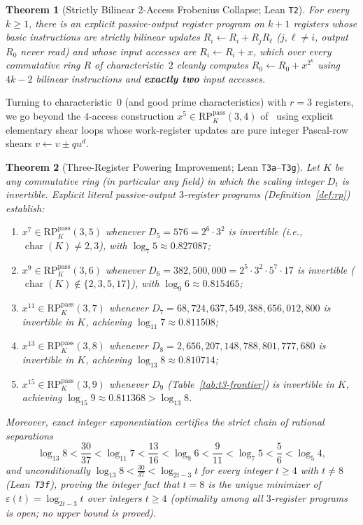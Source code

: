 \documentclass[11pt,reqno]{amsart}
\newtheorem{theorem}{Theorem}[section]
\theoremstyle{definition}
\newcommand{\RP}{\mathrm{RP}}
\newcommand{\pass}{\mathrm{pass}}
\begin{document}
\begin{theorem}[Strictly Bilinear 2-Access Frobenius Collapse; Lean \texttt{T2}]
\label{thm:T2}
For every $k \ge 1$, there is an explicit passive-output register program on $k + 1$ registers whose basic instructions are strictly bilinear updates $R_i \leftarrow R_i + R_j R_\ell$ ($j, \ell \neq i$, output $R_0$ never read) and whose input accesses are $R_i \leftarrow R_i + x$, which over \emph{every} commutative ring $R$ of characteristic~$2$ cleanly computes $R_0 \leftarrow R_0 + x^{2^k}$ using $4k - 2$ bilinear instructions and \textbf{exactly two} input accesses.
\end{theorem}

Turning to characteristic~$0$ (and good prime characteristics) with $r = 3$ registers, we go beyond the $4$-access construction $x^5 \in \RP_K^{\pass}(3, 4)$ of~\cite[Theorem~2.3]{Vinciguerra2026} using explicit elementary shear loops whose work-register updates are pure integer Pascal-row shears $v \leftarrow v \pm q u^d$.

\begin{theorem}[Three-Register Powering Improvement; Lean \texttt{T3a}--\texttt{T3g}]
\label{thm:T3}
Let $K$ be any commutative ring (in particular any field) in which the scaling integer $D_t$ is invertible.
Explicit literal passive-output $3$-register programs (Definition~\ref{def:rp}) establish:
\begin{enumerate}
  \item $x^7 \in \RP_K^{\pass}(3, 5)$ whenever $D_5 = 576 = 2^6 \cdot 3^2$ is invertible (i.e., $\operatorname{char}(K) \neq 2, 3$), with $\log_7 5 \approx 0.827087$;
  \item $x^9 \in \RP_K^{\pass}(3, 6)$ whenever $D_6 = 382{,}500{,}000 = 2^5 \cdot 3^2 \cdot 5^7 \cdot 17$ is invertible ($\operatorname{char}(K) \notin \{2, 3, 5, 17\}$), with $\log_9 6 \approx 0.815465$;
  \item $x^{11} \in \RP_K^{\pass}(3, 7)$ whenever $D_7 = 68{,}724{,}637{,}549{,}388{,}656{,}012{,}800$ is invertible in $K$, achieving $\log_{11} 7 \approx 0.811508$;
  \item $x^{13} \in \RP_K^{\pass}(3, 8)$ whenever $D_8 = 2{,}656{,}207{,}148{,}788{,}801{,}777{,}680$ is invertible in $K$, achieving $\log_{13} 8 \approx \mathbf{0.810714}$;
  \item $x^{15} \in \RP_K^{\pass}(3, 9)$ whenever $D_9$ (Table~\ref{tab:t3-frontier}) is invertible in $K$, achieving $\log_{15} 9 \approx 0.811368 > \log_{13} 8$.
\end{enumerate}
Moreover, exact integer exponentiation certifies the strict chain of rational separations
\[
  \log_{13} 8 < \frac{30}{37} < \log_{11} 7 < \frac{13}{16} < \log_9 6 < \frac{9}{11} < \log_7 5 < \frac{5}{6} < \log_5 4,
\]
and unconditionally $\log_{13} 8 < \frac{30}{37} < \log_{2t-3} t$ for \emph{every} integer $t \ge 4$ with $t \neq 8$ (Lean~\texttt{T3f}), proving the integer fact that $t = 8$ is the unique minimizer of $\varepsilon(t) = \log_{2t-3} t$ over integers $t \ge 4$ (optimality among all $3$-register programs is open; no upper bound is proved).
\end{theorem}
\end{document}
